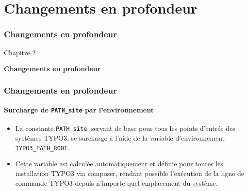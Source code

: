 %

\section{Changements en profondeur}
\begin{frame}[fragile]
	\frametitle{Changements en profondeur}

	\begin{center}\huge{Chapitre 2~:}\end{center}
	\begin{center}\huge{\color{typo3darkgrey}\textbf{Changements en profondeur}}\end{center}

\end{frame}


\begin{frame}[fragile]
	\frametitle{Changements en profondeur}
	\framesubtitle{Surcharge de \texttt{PATH\_site} par l'environnement}

	\begin{itemize}
		\item La constante \texttt{PATH\_site}, servant de base pour tous les points d'entrée
			des systèmes TYPO3, se surcharge à l'aide de la variable d'environnement
			\texttt{TYPO3\_PATH\_ROOT}.

		\item Cette variable est calculée automatiquement et définie pour toutes les installation
			TYPO3 via composer, rendant possible l'exécution de la ligne de commande TYPO3 depuis
			n'importe quel emplacement du système.

	\end{itemize}

\end{frame}


